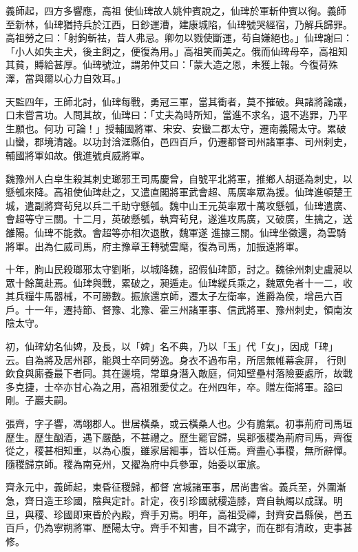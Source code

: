 \begin{pinyinscope}
 義師起，四方多響應，高祖
 使仙琕故人姚仲賓說之，仙琕於軍斬仲賓以徇。義師至新林，仙琕猶持兵於江西，日鈔運漕，建康城陷，仙琕號哭經宿，乃解兵歸罪。高祖勞之曰：「射鉤斬袪，昔人弗忌。卿勿以戮使斷運，茍自嫌絕也。」仙琕謝曰：「小人如失主犬，後主飼之，便復為用。」高祖笑而美之。俄而仙琕母卒，高祖知其貧，賻給甚厚。仙琕號泣，謂弟仲艾曰：「蒙大造之恩，未獲上報。今復荷殊澤，當與爾以心力自效耳。」



 天監四年，王師北討，仙琕每戰，勇冠三軍，當其衝者，莫不摧破。與諸將論議，口未嘗言功。人問其故，仙琕曰：「丈夫為時所知，當進不求名，退不逃罪，乃平生願也。何功
 可論！」授輔國將軍、宋安、安蠻二郡太守，遷南義陽太守。累破山蠻，郡境清謐。以功封浛洭縣伯，邑四百戶，仍遷都督司州諸軍事、司州刺史，輔國將軍如故。俄進號貞威將軍。



 魏豫州人白皁生殺其刺史瑯邪王司馬慶曾，自號平北將軍，推鄉人胡遜為刺史，以懸瓠來降。高祖使仙琕赴之，又遣直閣將軍武會超、馬廣率眾為援。仙琕進頓楚王城，遣副將齊茍兒以兵二千助守懸瓠。魏中山王元英率眾十萬攻懸瓠，仙琕遣廣、會超等守三關。十二月，英破懸瓠，執齊茍兒，遂進攻馬廣，又破廣，生擒之，送雒陽。仙琕不能救。會超等亦相次退散，魏軍遂
 進據三關。仙琕坐徵還，為雲騎將軍。出為仁威司馬，府主豫章王轉號雲麾，復為司馬，加振遠將軍。



 十年，朐山民殺瑯邪太守劉晣，以城降魏，詔假仙琕節，討之。魏徐州刺史盧昶以眾十餘萬赴焉。仙琕與戰，累破之，昶遁走。仙琕縱兵乘之，魏眾免者十一二，收其兵糧牛馬器械，不可勝數。振旅還京師，遷太子左衛率，進爵為侯，增邑六百戶。十一年，遷持節、督豫、北豫、霍三州諸軍事、信武將軍、豫州刺史，領南汝陰太守。



 初，仙琕幼名仙婢，及長，以「婢」名不典，乃以「玉」代「女」，因成「琕」云。自為將及居州郡，能與士卒同勞逸。身衣不過布帛，所居無帷幕衾屏，
 行則飲食與廝養最下者同。其在邊境，常單身潛入敵庭，伺知壁壘村落險要處所，故戰多克捷，士卒亦甘心為之用，高祖雅愛仗之。在州四年，卒。贈左衛將軍。謚曰剛。子巖夫嗣。



 張齊，字子響，馮翊郡人。世居橫桑，或云橫桑人也。少有膽氣。初事荊府司馬垣歷生。歷生酗酒，遇下嚴酷，不甚禮之。歷生罷官歸，吳郡張稷為荊府司馬，齊復從之，稷甚相知重，以為心腹，雖家居細事，皆以任焉。齊盡心事稷，無所辭憚。隨稷歸京師。稷為南兗州，又擢為府中兵參軍，始委以軍旅。



 齊永元中，義師起，東昏征稷歸，都督
 宮城諸軍事，居尚書省。義兵至，外圍漸急，齊日造王珍國，陰與定計。計定，夜引珍國就稷造膝，齊自執燭以成謀。明旦，與稷、珍國即東昏於內殿，齊手刃焉。明年，高祖受禪，封齊安昌縣侯，邑五百戶，仍為寧朔將軍、歷陽太守。齊手不知書，目不識字，而在郡有清政，吏事甚修。




\end{pinyinscope}
